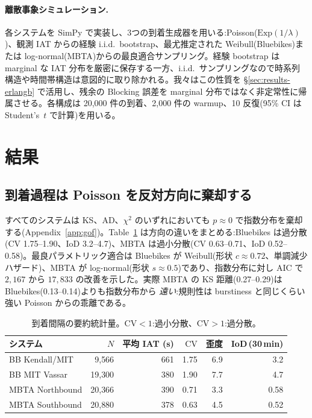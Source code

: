 \paragraph{離散事象シミュレーション.} 各システムを SimPy \cite{simpy} で実装し、3つの到着生成器を用いる:Poisson($\mathrm{Exp}(1/\lambda)$)、観測 IAT からの経験 i.i.d.\ bootstrap、最尤推定された Weibull(Bluebikes)または log-normal(MBTA)からの最良適合サンプリング。経験 bootstrap は marginal な IAT 分布を厳密に保存する一方、i.i.d.\ サンプリングなので時系列構造や時間帯構造は意図的に取り除かれる。我々はこの性質を \S\ref{sec:results-erlangb} で活用し、残余の Blocking 誤差を marginal 分布ではなく非定常性に帰属させる。各構成は 20{,}000 件の到着、2{,}000 件の warmup、10 反復(95\% CI は Student's~$t$ で計算)を用いる。

\section{結果}\label{sec:results}

\subsection{到着過程は Poisson を反対方向に棄却する}\label{sec:results-arrival}

すべてのシステムは KS、AD、$\chi^2$ のいずれにおいても $p \approx 0$ で指数分布を棄却する(Appendix~\ref{app:gof})。Table~\ref{tab:summary} は方向の違いをまとめる:Bluebikes は過分散($\mathrm{CV}$ 1.75--1.90、IoD 3.2--4.7)、MBTA は過小分散($\mathrm{CV}$ 0.63--0.71、IoD 0.52--0.58)。最良パラメトリック適合は Bluebikes が Weibull(形状 $c \approx 0.72$、単調減少ハザード)、MBTA が log-normal(形状 $s \approx 0.5$)であり、指数分布に対し AIC で $2{,}167$ から $17{,}833$ の改善を示した。実際 MBTA の KS 距離(0.27--0.29)は Bluebikes(0.13--0.14)よりも指数分布から \emph{遠い}:規則性は burstiness と同じくらい強い Poisson からの乖離である。

\begin{table}[h]
\centering
\caption{到着間隔の要約統計量。$\mathrm{CV} < 1$:過小分散、$\mathrm{CV} > 1$:過分散。}
\label{tab:summary}
\footnotesize
\begin{tabular}{@{}lrrrrr@{}}
\toprule
システム & $N$ & 平均 IAT (s) & $\mathrm{CV}$ & 歪度 & IoD\,(30\,min) \\
\midrule
BB Kendall/MIT   & 9{,}566  & 661 & 1.75 & 6.9 & 3.2 \\
BB MIT Vassar    & 19{,}300 & 380 & 1.90 & 7.7 & 4.7 \\
MBTA Northbound  & 20{,}366 & 390 & 0.71 & 3.3 & 0.58 \\
MBTA Southbound  & 20{,}880 & 378 & 0.63 & 4.5 & 0.52 \\
\bottomrule
\end{tabular}
\end{table}


